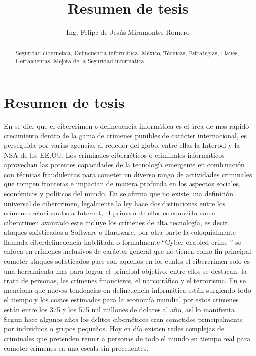 \documentclass[runningheads,a4paper]{llncs}
\newcommand{\keywords}[1]{\par\addvspace\baselineskip
\noindent\keywordname\enspace\ignorespaces#1}
\begin{document}
\mainmatter  
\title{Resumen de tesis}
\author{Ing. Felipe de Jesús Miramontes Romero}
\maketitle


\begin{abstract}
\keywords{Seguridad cibernetica, Delincuencia informática, México, Técnicas, Estrategias, Planes, Herramientas, Mejora de la Seguridad informática}
\end{abstract}


\section{Resumen de tesis}
En \cite{Interpol_1} se dice que el cibercrimen o delincuencia informática es el área de mas rápido crecimiento dentro de la gama de crímenes punibles de carácter internacional, es perseguida por varias agencias al rededor del globo, entre ellas la Interpol y la \gls{NSA} de los \gls{EE.UU}. Los criminales cibernéticos o criminales informáticos aprovechan las potentes capacidades de la tecnología emergente en combinación con técnicas fraudulentas para cometer un diverso rango de actividades criminales que rompen fronteras e impactan de manera profunda en los aspectos sociales, económicos y políticos del mundo. En \cite{Interpol_1} se afirma que no existe una definición universal de cibercrimen, legalmente la ley hace dos distinciones entre los crímenes relacionados a Internet, el primero de ellos es conocido como cibercrimen avanzado este incluye los crímenes de alta tecnología, es decir; ataques sofisticados a Software o Hardware, por otra parte la coloquialmente llamada ciberdelincuencia habilitada o formalmente ``Cyber-enabled crime '' se enfoca en crímenes inclusivos de carácter general que no tienen como fin principal cometer ataques sofisticados pues son aquellos en los cuales el cibercrimen solo es una herramienta mas para lograr el principal objetivo, entre ellos se destacan: la trata de personas, los crímenes financieros, el narcotráfico y el terrorismo. En \cite{Interpol_1} se menciona que nuevas tendencias en delincuencia informática están surgiendo todo el tiempo y los costos estimados para la economía mundial por estos crímenes están entre los 375 y los 575 mil millones de dolares al año, así lo manifienta \cite{Forbes_1}. Segun \cite{Interpol_1} hace algunos años los delitos cibernéticos eran cometidos principalmente por individuos o grupos pequeños. Hoy en día existen redes complejas de criminales que pretenden reunir a personas de todo el mundo en tiempo real para cometer crímenes en una escala sin precedentes.\\
\end{document}
